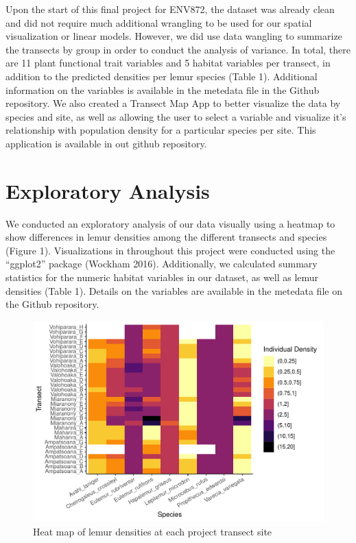 \documentclass[
  12pt,
]{article}
\begin{document}
Upon the start of this final project for ENV872, the dataset was already
clean and did not require much additional wrangling to be used for our
spatial visualization or linear models. However, we did use data
wangling to summarize the transects by group in order to conduct the
analysis of variance. In total, there are 11 plant functional trait
variables and 5 habitat variables per transect, in addition to the
predicted densities per lemur species (Table 1). Additional information
on the variables is available in the metedata file in the Github
repository. We also created a Transect Map App to better visualize the
data by species and site, as well as allowing the user to select a
variable and visualize it's relationship with population density for a
particular species per site. This application is available in out github
repository.

\newpage

\hypertarget{exploratory-analysis}{%
\section{Exploratory Analysis}\label{exploratory-analysis}}

We conducted an exploratory analysis of our data visually using a
heatmap to show differences in lemur densities among the different
transects and species (Figure 1). Visualizations in throughout this
project were conducted using the ``ggplot2'' package (Wockham 2016).
Additionally, we calculated summary statistics for the numeric habitat
variables in our dataset, as well as lemur densities (Table 1). Details
on the variables are available in the metedata file on the Github
repository.

\begin{figure}

{\centering \includegraphics{project_draft_2_files/figure-latex/unnamed-chunk-2-1} 

}

\caption{Heat map of lemur densities at each project transect site}\label{fig:unnamed-chunk-2}
\end{figure}
\newpage
\end{document}
